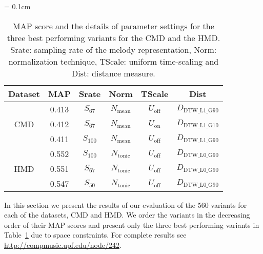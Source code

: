 \begin{table} 
	\centering
	\tabcolsep = 0.1cm
	\begin{tabular}{ c | c c c c c}
		\hline\hline
		Dataset   	& 	MAP	&	Srate		&	Norm 	&	TScale 		&	Dist \\	
		\hline
		\multirow{3}{*}{CMD}   	
		& 	0.413 	&	$S_{67}$			&	$N_{\mathrm{mean}}$ 	&	$U_{\mathrm{off}}$		&	$D_{\mathrm{DTW\_L1\_G90}}$\\	
		& 	0.412 	&	$S_{67}$		&	$N_{\mathrm{mean}}$ 	&	$U_{\mathrm{on}}$		&	$D_{\mathrm{DTW\_L1\_G10}}$\\	
		& 	0.411	&	$S_{100}$		&	$N_{\mathrm{mean}}$ 	&	$U_{\mathrm{off}}$		&	$D_{\mathrm{DTW\_L1\_G90}}$\\	
		\hline		
		\multirow{3}{*}{HMD}   	
		& 	0.552	&	$S_{100}$		&	$N_{\mathrm{tonic}}$ 	&	$U_{\mathrm{off}}$		&	$D_{\mathrm{DTW\_L0\_G90}}$\\	
		& 	0.551 	&	$S_{67}$	&	$N_{\mathrm{tonic}}$ 	&	$U_{\mathrm{off}}$		&	$D_{\mathrm{DTW\_L0\_G90}}$\\	
		& 	0.547 	&	$S_{50}$		&	$N_{\mathrm{tonic}}$ 	&	$U_{\mathrm{off}}$		&	$D_{\mathrm{DTW\_L0\_G90}}$\\	
		\hline\hline
		
	\end{tabular}
	\caption{MAP score and the details of parameter settings for the three best performing variants for the CMD and the HMD. Srate: sampling rate of the melody representation, Norm: normalization technique, TScale: uniform time-scaling and  Dist: distance measure.}\vspace{-1em}
	\label{tab:results5Best}
\end{table}


In this section we present the results of our evaluation of the 560 variants for each of the datasets, CMD and HMD.     We order the variants in the decreasing order of their MAP scores and present only the three best performing variants in Table~\ref{tab:results5Best} due to space constraints. For complete results see \url{http://compmusic.upf.edu/node/242}. 

